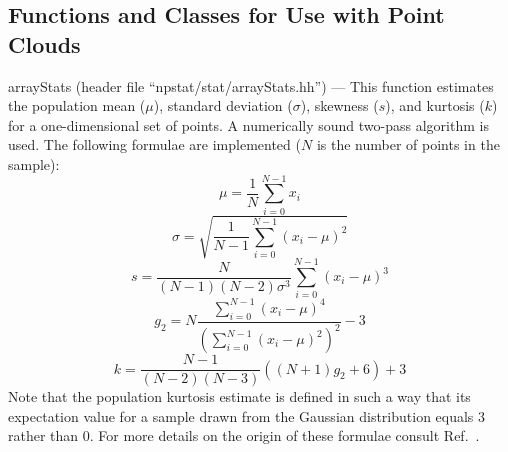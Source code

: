 \documentclass[12pt,titlepage]{article}
\newcommand{\cname}[1]{\index{#1}\textsf{#1}}
\begin{document}
\subsection{Functions and Classes for Use with Point Clouds}

\cname{arrayStats} (header file ``npstat/stat/arrayStats.hh'') --- This
function estimates the population mean ($\mu$), standard deviation ($\sigma$),
skewness ($s$),
and kurtosis ($k$) for a one-dimensional set of points. A numerically sound
two-pass algorithm is used.
The following formulae are implemented ($N$ is the number of points
in the sample):
\begin{equation}
\mu = \frac{1}{N} \sum_{i=0}^{N-1} x_i
\label{eq:samplemean}
\end{equation}
\begin{equation}
\sigma = \sqrt{\frac{1}{N - 1} \sum_{i=0}^{N-1} (x_i - \mu)^2}
\label{eq:samplestdev}
\end{equation}
\begin{equation}
s = \frac{N}{(N - 1) (N - 2) \sigma^3} \sum_{i=0}^{N-1} (x_i - \mu)^3
\end{equation}
\begin{equation}
g_2 = N \frac{\sum_{i=0}^{N-1} (x_i - \mu)^4}{\left( \sum_{i=0}^{N-1} (x_i - \mu)^2 \right)^2} - 3
\label{eq:kurtosisg2}
\end{equation}
\begin{equation}
k = \frac{N - 1}{(N - 2) (N - 3)} ((N + 1) g_2 + 6) + 3
\label{eq:kurtosis}
\end{equation}
Note that the population kurtosis estimate is defined in such a way that its
expectation value for a sample drawn from the Gaussian distribution equals
3 rather than 0. For more details on the origin of these formulae
consult Ref.~\cite{ref:sampleskewkurt}.
\end{document}
